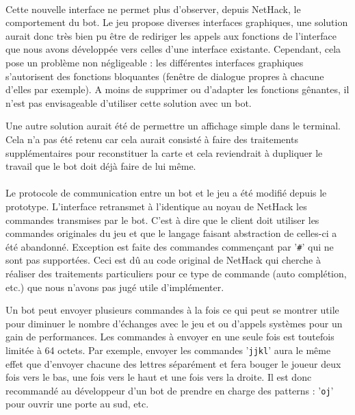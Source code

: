 \documentclass[a4paper,12pt]{article}
\begin{document}
\paragraph{} Cette nouvelle interface ne permet plus d'observer, depuis
NetHack, le comportement du bot. Le jeu propose diverses interfaces
graphiques, une solution aurait donc très bien pu être de rediriger les appels
aux fonctions de l'interface que nous avons développée vers celles d'une
interface existante. Cependant, cela pose un problème non négligeable : les
différentes interfaces graphiques s'autorisent des fonctions bloquantes
(fenêtre de dialogue propres à chacune d'elles par exemple). A moins de
supprimer ou d'adapter les fonctions gênantes, il n'est pas envisageable
d'utiliser cette solution avec un bot.

Une autre solution aurait été de permettre un affichage simple dans le
terminal. Cela n'a pas été retenu car cela aurait consisté à faire des
traitements supplémentaires pour reconstituer la carte et cela reviendrait à
dupliquer le travail que le bot doit déjà faire de lui même.

\paragraph{} Le protocole de communication entre un bot et le jeu a été
modifié depuis le prototype. L'interface retransmet à l'identique au noyau de
NetHack les commandes transmises par le bot. C'est à dire que le client doit
utiliser les commandes originales du jeu et que le langage faisant abstraction
de celles-ci a été abandonné. Exception est faite des commandes commençant par
'\verb!#!' qui ne sont pas supportées. Ceci est dû au code original de NetHack
qui cherche à réaliser des traitements particuliers pour ce type de commande
(auto complétion, etc.) que nous n'avons pas jugé utile d'implémenter.

Un bot peut envoyer plusieurs commandes à la fois ce qui peut se montrer utile
pour diminuer le nombre d'échanges avec le jeu et ou d'appels systèmes pour un
gain de performances. Les commandes à envoyer en une seule fois est toutefois
limitée à 64 octets. Par exemple, envoyer les commandes '\verb!jjkl!' aura le
même effet que d'envoyer chacune des lettres séparément et fera bouger le
joueur deux fois vers le bas, une fois vers le haut et une fois vers la
droite. Il est donc recommandé au développeur d'un bot de prendre en charge
des patterns : '\verb!oj!' pour ouvrir une porte au sud, etc.
\end{document}
